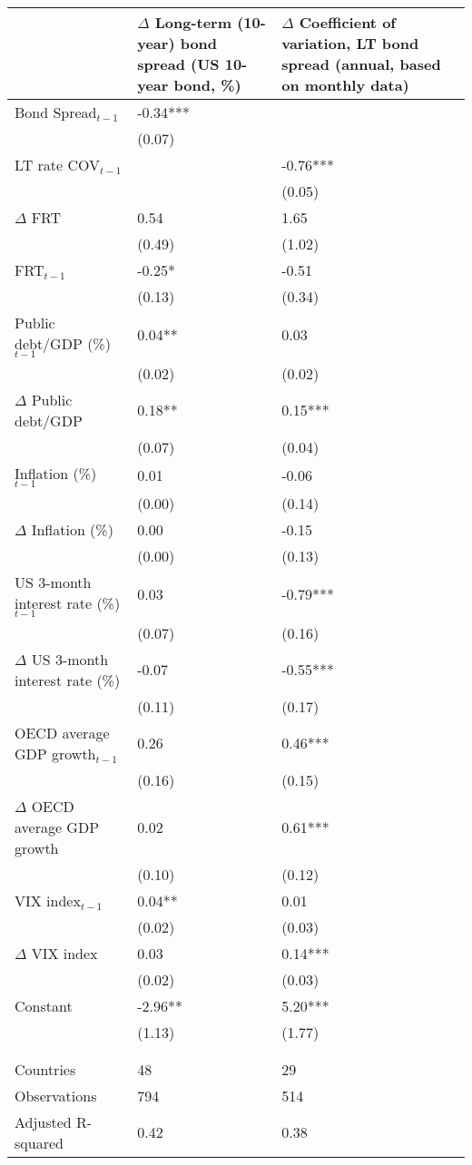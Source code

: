 {\tiny
\begin{tabular}{lp{2cm}p{2cm}}
  \hline
 & $\Delta$ Long-term (10-year) bond spread (US 10-year bond, \%) & $\Delta$ Coefficient of variation, LT bond spread (annual, based on monthly data) \\ 
  \hline
Bond Spread$_{t-1}$ & -0.34*** &  \\ 
   & (0.07) &  \\ 
  LT rate COV$_{t-1}$ &  & -0.76*** \\ 
   &  & (0.05) \\ 
  $\Delta$ FRT & 0.54 & 1.65 \\ 
   & (0.49) & (1.02) \\ 
  FRT$_{t-1}$ & -0.25* & -0.51 \\ 
   & (0.13) & (0.34) \\ 
  Public debt/GDP (\%)$_{t-1}$ & 0.04** & 0.03 \\ 
   & (0.02) & (0.02) \\ 
  $\Delta$ Public debt/GDP & 0.18** & 0.15*** \\ 
   & (0.07) & (0.04) \\ 
  Inflation (\%) $_{t-1}$ & 0.01 & -0.06 \\ 
   & (0.00) & (0.14) \\ 
  $\Delta$ Inflation (\%) & 0.00 & -0.15 \\ 
   & (0.00) & (0.13) \\ 
  US 3-month interest rate (\%)$_{t-1}$ & 0.03 & -0.79*** \\ 
   & (0.07) & (0.16) \\ 
  $\Delta$ US 3-month interest rate (\%) & -0.07 & -0.55*** \\ 
   & (0.11) & (0.17) \\ 
  OECD average GDP growth$_{t-1}$ & 0.26 & 0.46*** \\ 
   & (0.16) & (0.15) \\ 
  $\Delta$ OECD average GDP growth & 0.02 & 0.61*** \\ 
   & (0.10) & (0.12) \\ 
  VIX index$_{t-1}$ & 0.04** & 0.01 \\ 
   & (0.02) & (0.03) \\ 
  $\Delta$ VIX index & 0.03 & 0.14*** \\ 
   & (0.02) & (0.03) \\ 
  Constant & -2.96** & 5.20*** \\ 
   & (1.13) & (1.77) \\ 
   &  &  \\ 
   &  &  \\ 
  Countries & 48 & 29 \\ 
  Observations & 794 & 514 \\ 
  Adjusted R-squared & 0.42 & 0.38 \\ 
   \hline
\end{tabular}
}
